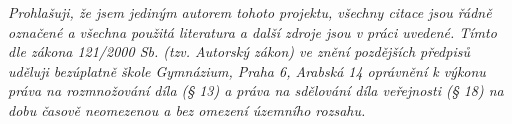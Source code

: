 \textit{
Prohlašuji, že jsem jediným autorem tohoto projektu, všechny citace jsou řádně označené a
všechna použitá literatura a další zdroje jsou v práci uvedené. Tímto dle zákona 121/2000
Sb. (tzv. Autorský zákon) ve znění pozdějších předpisů uděluji bezúplatně škole
Gymnázium, Praha 6, Arabská 14 oprávnění k výkonu práva na rozmnožování díla (§ 13) a
práva na sdělování díla veřejnosti (§ 18) na dobu časově neomezenou a bez omezení
územního rozsahu.
}
